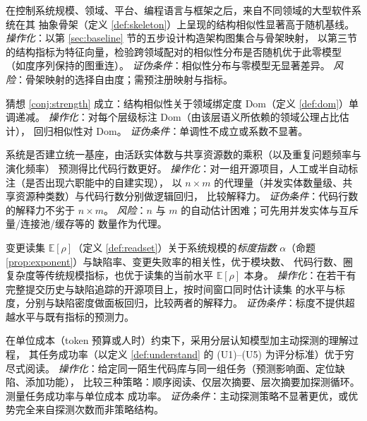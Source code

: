 \begin{hypothesis}[结构收敛高于随机基线]\label{hyp:h1}
在控制系统规模、领域、平台、编程语言与框架之后，来自不同领域的大型软件系统在其
抽象骨架（定义 \ref{def:skeleton}）上呈现的结构相似性显著高于随机基线。
\emph{操作化}：以第 \ref{sec:baseline} 节的五步设计构造架构图集合与骨架映射，
以第三节的结构指标为特征向量，检验跨领域配对的相似性分布是否随机优于此零模型
（如度序列保持的图重连）。
\emph{证伪条件}：相似性分布与零模型无显著差异。
\emph{风险}：骨架映射的选择自由度；需预注册映射与指标。
\end{hypothesis}

\begin{hypothesis}[收敛强度关于领域绑定度单调]\label{hyp:h2}
猜想 \ref{conj:strength} 成立：结构相似性关于领域绑定度
$\mathrm{Dom}$（定义 \ref{def:dom}）单调递减。
\emph{操作化}：对每个层级标注 $\mathrm{Dom}$（由该层语义所依赖的领域公理占比估计），
回归相似性对 $\mathrm{Dom}$。
\emph{证伪条件}：单调性不成立或系数不显著。
\end{hypothesis}

\begin{hypothesis}\label{hyp:h3}
系统是否建立统一基座，由活跃实体数与共享资源数的乘积（以及重复问题频率与演化频率）
预测得比代码行数更好。
\emph{操作化}：对一组开源项目，人工或半自动标注（是否出现六职能中的自建实现），
以 $n \times m$ 的代理量（并发实体数量级、共享资源种类数）与代码行数分别做逻辑回归，
比较解释力。
\emph{证伪条件}：代码行数的解释力不劣于 $n \times m$。
\emph{风险}：$n$ 与 $m$ 的自动估计困难；可先用并发实体与互斥量/连接池/缓存等的
数量作为代理。
\end{hypothesis}

\begin{hypothesis}[读集的标度优于传统规模指标]\label{hyp:h4}
变更读集 $\mathbb{E}[\rho]$（定义 \ref{def:readset}）关于系统规模的\emph{标度指数}
$\alpha$（命题 \ref{prop:exponent}）与缺陷率、变更失败率的相关性，优于模块数、
代码行数、圈复杂度等传统规模指标，也优于读集的当前水平
$\mathbb{E}[\rho]$ 本身。
\emph{操作化}：在若干有完整提交历史与缺陷追踪的开源项目上，按时间窗口同时估计读集
的水平与标度，分别与缺陷密度做面板回归，比较两者的解释力。
\emph{证伪条件}：标度不提供超越水平与既有指标的预测力。
\end{hypothesis}

\begin{hypothesis}[分层模型加主动探测优于穷尽阅读]\label{hyp:h5}
在单位成本（token 预算或人时）约束下，采用分层认知模型加主动探测的理解过程，
其任务成功率（以定义 \ref{def:understand} 的 (U1)--(U5) 为评分标准）优于穷尽式阅读。
\emph{操作化}：给定同一陌生代码库与同一组任务（预测影响面、定位缺陷、添加功能），
比较三种策略：顺序阅读、仅层次摘要、层次摘要加探测循环。测量任务成功率与单位成本
成功率。
\emph{证伪条件}：主动探测策略不显著更优，或优势完全来自探测次数而非策略结构。
\end{hypothesis}

